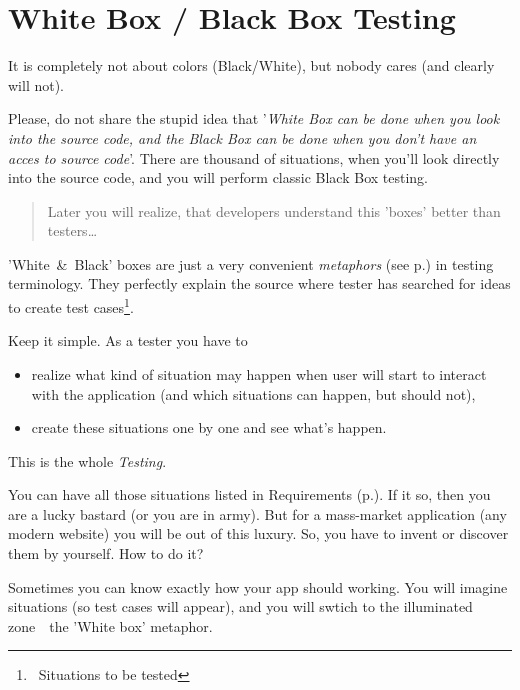 \section{White Box / Black Box Testing}
\label{sec:White Box Black Box Testing}

It is completely not about colors (Black/White), but nobody cares (and clearly will not).

Please, do not share the stupid idea that '\textit{White Box can be done when you look into the source code, and the Black Box can be done when you don't have an acces to source code}'. There are thousand of situations, when you'll look directly into the source code, and you will perform classic Black Box testing.

\begin{quote}
 Later you will realize, that developers understand this 'boxes' better than testers\ldots
\end{quote} 

 'White~\&~Black' boxes are just a very convenient \emph{metaphors} (see p.\pageref{sec:Metaphor}) in testing terminology. They perfectly explain the source where tester has searched for ideas to create test cases\footnote{~Situations to be tested}.

Keep it simple.  As a tester you have to 
\begin{itemize}
\item 
realize what kind of situation may happen when user will start to interact with the application (and which situations can happen, but should not), 
\item 
create these situations one by one and see what's happen.                                                                                                                                                                                                              \end{itemize}

This is the whole \emph{Testing}.

You can have all those situations listed in Requirements (p.\pageref{sec:Requirement}). If it so, then you are a lucky bastard (or you are in army). But for a mass-market application (any modern website) you will be out of this luxury. So, you have to invent or discover them by yourself. How to do it?

Sometimes you can know exactly how your app should working. You will imagine situations (so test cases will appear), and you will swtich to the illuminated zone~\textemdash~the 'White box' metaphor.

